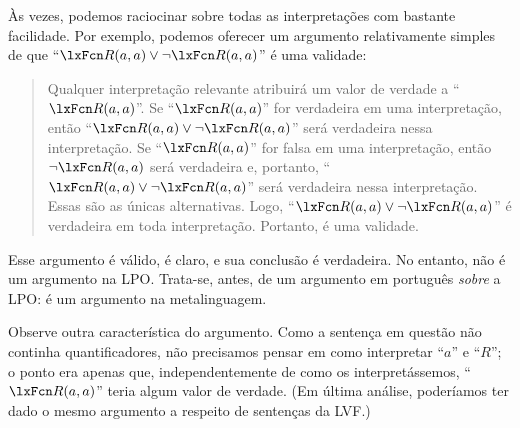 Às vezes, podemos raciocinar sobre todas as interpretações com bastante facilidade. Por exemplo, podemos oferecer um argumento relativamente simples de que \textquotedblleft $\atom{R}{a,a}\eor\enot \atom{R}{a,a}$\textquotedblright{} é uma validade:
	\begin{quote}
		\label{allmodels1}
Qualquer interpretação relevante atribuirá um valor de verdade a \textquotedblleft $\atom{R}{a,a}$\textquotedblright{}. Se \textquotedblleft $\atom{R}{a,a}$\textquotedblright{} for verdadeira em uma interpretação, então \textquotedblleft $\atom{R}{a,a} \eor \enot\atom{R}{a,a}$\textquotedblright{} será verdadeira nessa interpretação. Se \textquotedblleft $\atom{R}{a,a}$\textquotedblright{} for falsa em uma interpretação, então $\enot\atom{R}{a,a}$ será verdadeira e, portanto, \textquotedblleft $\atom{R}{a,a} \eor\enot \atom{R}{a,a}$\textquotedblright{} será verdadeira nessa interpretação. Essas são as únicas alternativas. Logo, \textquotedblleft $\atom{R}{a,a} \eor\enot \atom{R}{a,a}$\textquotedblright{} é verdadeira em toda interpretação. Portanto, é uma validade.
	\end{quote}
Esse argumento é válido, é claro, e sua conclusão é verdadeira. No entanto, não é um argumento na LPO. Trata-se, antes, de um argumento em português \emph{sobre} a LPO: é um argumento na metalinguagem.

Observe outra característica do argumento. Como a sentença em questão não continha quantificadores, não precisamos pensar em como interpretar \textquotedblleft $a$\textquotedblright{} e \textquotedblleft $R$\textquotedblright{}; o ponto era apenas que, independentemente de como os interpretássemos, \textquotedblleft $\atom{R}{a,a}$\textquotedblright{} teria algum valor de verdade. (Em última análise, poderíamos ter dado o mesmo argumento a respeito de sentenças da LVF.)

